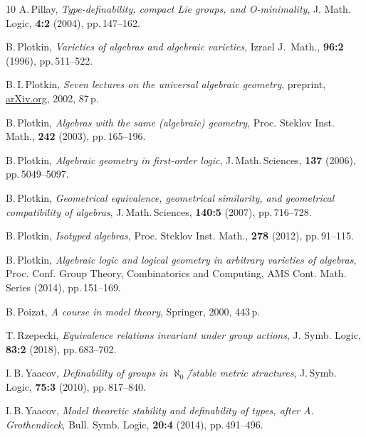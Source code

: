 \documentclass[12pt]{article}
\theoremstyle{definition}
\begin{document}
\begin{thebibliography}{10}
A.\,Pillay, {\it Type-definability, compact Lie groups, and O-minimality}, J. Math. Logic, {\bf  4:2} (2004), pp.\,147--162.

B.\,Plotkin, {\it Varieties of algebras and algebraic varieties}, Izrael J.~Math., {\bf  96:2} (1996), pp.\,511--522.

B.\,I.\,Plotkin, {\it Seven lectures on the universal algebraic geometry}, pre\-print, \href{https://arxiv.org/abs/math/0204245}{arXiv.org}, 2002, 87\,p.

B.\,Plotkin, {\it Algebras with the same (algebraic) geometry}, Proc. Steklov Inst. Math., {\bf 242} (2003), pp.\,165--196.	

B.\,Plotkin, {\it Algebraic geometry in first-order logic}, J.\,Math.\,Sciences, {\bf 137} (2006), pp.\,5049--5097.

B.\,Plotkin, {\it Geometrical equivalence, geometrical similarity, and geometrical compatibility of algebras}, J.\,Math.\,Sciences, {\bf 140:5} (2007), pp.\,716--728.

B.\,Plotkin, {\it Isotyped algebras}, Proc.  Steklov Inst. Math., {\bf 278} (2012), pp.\,91--115.

B.\,Plotkin, {\it Algebraic logic and logical geometry in arbitrary varieties of algebras}, Proc. Conf. Group Theory, Combinatorics and Computing, AMS Cont. Math. Series (2014), pp.\,151--169.

B.\,Poizat, {\it A course in model theory}, Springer, 2000, 443\,p.

T.\,Rzepecki, {\it Equivalence relations invariant under group actions}, 
J. Symb. Logic, {\bf 83:2} (2018), pp.\,683--702.

I.\,B.\,Yaacov, {\it Definability of groups in $\aleph_0$\=/stable metric structures}, J.\,Symb. Logic, {\bf 75:3} (2010), pp.\,817--840.

I.\,B.\,Yaacov, {\it Model theoretic stability and definability of types, after
A.\,Grothendieck}, Bull. Symb. Logic, {\bf 20:4} (2014), pp.\,491--496.

\end{thebibliography}
\end{document}
